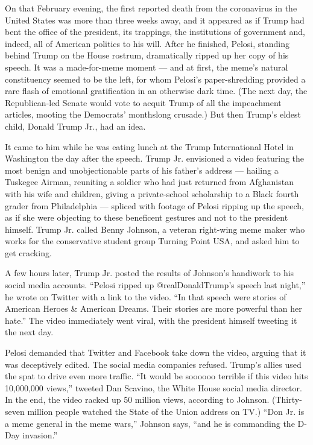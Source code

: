 On that February evening, the first reported death from the coronavirus
in the United States was more than three weeks away, and it appeared as
if Trump had bent the office of the president, its trappings, the
institutions of government and, indeed, all of American politics to his
will. After he finished, Pelosi, standing behind Trump on the House
rostrum, dramatically ripped up her copy of his speech. It was a
made-for-meme moment --- and at first, the meme's natural constituency
seemed to be the left, for whom Pelosi's paper-shredding provided a rare
flash of emotional gratification in an otherwise dark time. (The next
day, the Republican-led Senate would vote to acquit Trump of all the
impeachment articles, mooting the Democrats' monthslong crusade.) But
then Trump's eldest child, Donald Trump Jr., had an idea.

It came to him while he was eating lunch at the Trump International
Hotel in Washington the day after the speech. Trump Jr. envisioned a
video featuring the most benign and unobjectionable parts of his
father's address --- hailing a Tuskegee Airman, reuniting a soldier who
had just returned from Afghanistan with his wife and children, giving a
private-school scholarship to a Black fourth grader from Philadelphia
--- spliced with footage of Pelosi ripping up the speech, as if she were
objecting to these beneficent gestures and not to the president himself.
Trump Jr. called Benny Johnson, a veteran right-wing meme maker who
works for the conservative student group Turning Point USA, and asked
him to get cracking.

A few hours later, Trump Jr. posted the results of Johnson's handiwork
to his social media accounts. ``Pelosi ripped up @realDonaldTrump's
speech last night,'' he wrote on Twitter with a link to the video. ``In
that speech were stories of American Heroes \& American Dreams. Their
stories are more powerful than her hate.'' The video immediately went
viral, with the president himself tweeting it the next day.

Pelosi demanded that Twitter and Facebook take down the video, arguing
that it was deceptively edited. The social media companies refused.
Trump's allies used the spat to drive even more traffic. ``It would be
soooooo terrible if this video hits 10,000,000 views,'' tweeted Dan
Scavino, the White House social media director. In the end, the video
racked up 50 million views, according to Johnson. (Thirty-seven million
people watched the State of the Union address on TV.) ``Don Jr. is a
meme general in the meme wars,'' Johnson says, ``and he is commanding
the D-Day invasion.''

